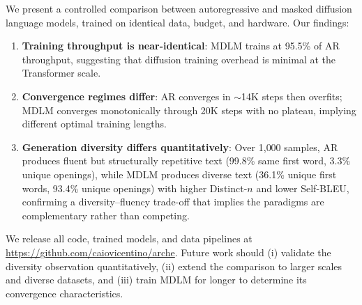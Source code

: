 \documentclass[11pt,a4paper]{article}
\begin{document}
We present a controlled comparison between autoregressive and masked diffusion language models, trained on identical data, budget, and hardware.
Our findings:

\begin{enumerate}[leftmargin=*,itemsep=2pt]
  \item \textbf{Training throughput is near-identical}: MDLM trains at 95.5\% of AR throughput, suggesting that diffusion training overhead is minimal at the Transformer scale.

  \item \textbf{Convergence regimes differ}: AR converges in ${\sim}$14K steps then overfits; MDLM converges monotonically through 20K steps with no plateau, implying different optimal training lengths.

  \item \textbf{Generation diversity differs quantitatively}: Over 1{,}000 samples, AR produces fluent but structurally repetitive text (99.8\% same first word, 3.3\% unique openings), while MDLM produces diverse text (36.1\% unique first words, 93.4\% unique openings) with higher Distinct-$n$ and lower Self-BLEU, confirming a diversity--fluency trade-off that implies the paradigms are complementary rather than competing.
\end{enumerate}

We release all code, trained models, and data pipelines at \url{https://github.com/caiovicentino/arche}.
Future work should (i) validate the diversity observation quantitatively, (ii) extend the comparison to larger scales and diverse datasets, and (iii) train MDLM for longer to determine its convergence characteristics.


\end{document}
